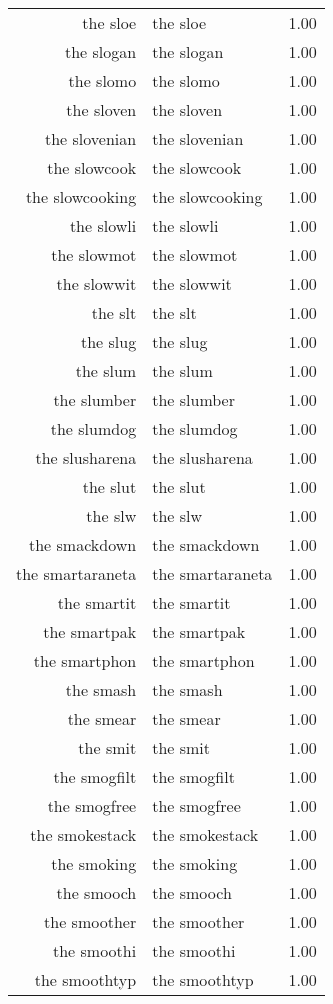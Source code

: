 \begin{table}[ht]
\begin{tabular}{rlr}
  the sloe & the sloe & 1.00 \\ 
  the slogan & the slogan & 1.00 \\ 
  the slomo & the slomo & 1.00 \\ 
  the sloven & the sloven & 1.00 \\ 
  the slovenian & the slovenian & 1.00 \\ 
  the slowcook & the slowcook & 1.00 \\ 
  the slowcooking & the slowcooking & 1.00 \\ 
  the slowli & the slowli & 1.00 \\ 
  the slowmot & the slowmot & 1.00 \\ 
  the slowwit & the slowwit & 1.00 \\ 
  the slt & the slt & 1.00 \\ 
  the slug & the slug & 1.00 \\ 
  the slum & the slum & 1.00 \\ 
  the slumber & the slumber & 1.00 \\ 
  the slumdog & the slumdog & 1.00 \\ 
  the slusharena & the slusharena & 1.00 \\ 
  the slut & the slut & 1.00 \\ 
  the slw & the slw & 1.00 \\ 
  the smackdown & the smackdown & 1.00 \\ 
  the smartaraneta & the smartaraneta & 1.00 \\ 
  the smartit & the smartit & 1.00 \\ 
  the smartpak & the smartpak & 1.00 \\ 
  the smartphon & the smartphon & 1.00 \\ 
  the smash & the smash & 1.00 \\ 
  the smear & the smear & 1.00 \\ 
  the smit & the smit & 1.00 \\ 
  the smogfilt & the smogfilt & 1.00 \\ 
  the smogfree & the smogfree & 1.00 \\ 
  the smokestack & the smokestack & 1.00 \\ 
  the smoking & the smoking & 1.00 \\ 
  the smooch & the smooch & 1.00 \\ 
  the smoother & the smoother & 1.00 \\ 
  the smoothi & the smoothi & 1.00 \\ 
  the smoothtyp & the smoothtyp & 1.00 \\ 

\end{tabular}
\end{table}

